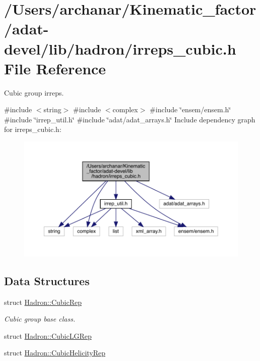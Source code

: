 \hypertarget{adat-devel_2lib_2hadron_2irreps__cubic_8h}{}\section{/\+Users/archanar/\+Kinematic\+\_\+factor/adat-\/devel/lib/hadron/irreps\+\_\+cubic.h File Reference}
\label{adat-devel_2lib_2hadron_2irreps__cubic_8h}


Cubic group irreps.  


{\ttfamily \#include $<$string$>$}\newline
{\ttfamily \#include $<$complex$>$}\newline
{\ttfamily \#include \char`\"{}ensem/ensem.\+h\char`\"{}}\newline
{\ttfamily \#include \char`\"{}irrep\+\_\+util.\+h\char`\"{}}\newline
{\ttfamily \#include \char`\"{}adat/adat\+\_\+arrays.\+h\char`\"{}}\newline
Include dependency graph for irreps\+\_\+cubic.\+h\+:
\nopagebreak
\begin{figure}[H]
\begin{center}
\leavevmode
\includegraphics[width=350pt]{da/d53/adat-devel_2lib_2hadron_2irreps__cubic_8h__incl}
\end{center}
\end{figure}
\subsection*{Data Structures}
\begin{DoxyCompactItemize}
\item 
struct \mbox{\hyperlink{structHadron_1_1CubicRep}{Hadron\+::\+Cubic\+Rep}}
\begin{DoxyCompactList}\small\item\em Cubic group base class. \end{DoxyCompactList}\item 
struct \mbox{\hyperlink{structHadron_1_1CubicLGRep}{Hadron\+::\+Cubic\+L\+G\+Rep}}
\item 
struct \mbox{\hyperlink{structHadron_1_1CubicHelicityRep}{Hadron\+::\+Cubic\+Helicity\+Rep}}
\end{DoxyCompactItemize}
